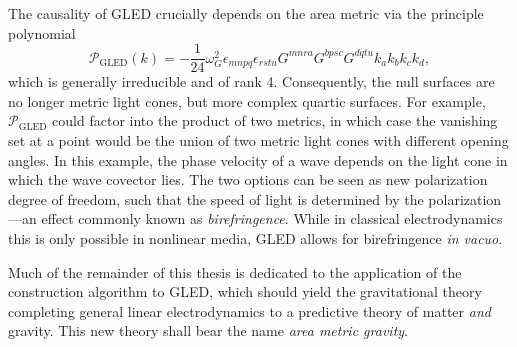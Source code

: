 The causality of GLED crucially depends on the area metric via the principle polynomial\cite{}
\begin{equation}\label{gled_polynomial}
  \mathcal P_\text{GLED}(k) = -\frac{1}{24} \omega_G^2 \epsilon_{mnpq} \epsilon_{rstu} G^{mnra} G^{bpsc} G^{dqtu} k_a k_b k_c k_d,
\end{equation}
which is generally irreducible and of rank 4. Consequently, the null surfaces are no longer metric light cones, but more complex quartic surfaces. For example, $\mathcal P_\text{GLED}$ could factor into the product of two metrics, in which case the vanishing set at a point would be the union of two metric light cones with different opening angles. In this example, the phase velocity of a wave depends on the light cone in which the wave covector lies. The two options can be seen as new polarization degree of freedom, such that the speed of light is determined by the polarization---an effect commonly known as \emph{birefringence}. While in classical electrodynamics this is only possible in nonlinear media, GLED allows for birefringence \emph{in vacuo}.

Much of the remainder of this thesis is dedicated to the application of the construction algorithm to GLED, which should yield the gravitational theory completing general linear electrodynamics to a predictive theory of matter \emph{and} gravity. This new theory shall bear the name \emph{area metric gravity}.

